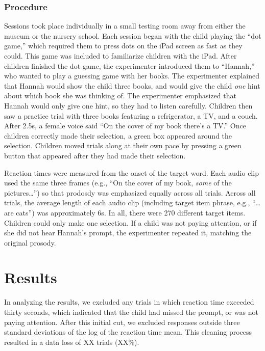 \documentclass[10pt, letterpaper]{article}
\begin{document}
\subsubsection{Procedure}\label{procedure}

Sessions took place individually in a small testing room away from
either the museum or the nursery school. Each session began with the
child playing the ``dot game,'' which required them to press dots on the
iPad screen as fast as they could. This game was included to familiarize
children with the iPad. After children finished the dot game, the
experimenter introduced them to ``Hannah,'' who wanted to play a
guessing game with her books. The experimenter explained that Hannah
would show the child three books, and would give the child \emph{one}
hint about which book she was thinking of. The experimenter emphasized
that Hannah would only give one hint, so they had to listen carefully.
Children then saw a practice trial with three books featuring a
refrigerator, a TV, and a couch. After 2.5s, a female voice said ``On
the cover of my book there's a TV.'' Once children correctly made their
selection, a green box appeared around the selection. Children moved
trials along at their own pace by pressing a green button that appeared
after they had made their selection.

Reaction times were measured from the onset of the target word. Each
audio clip used the same three frames (e.g., ``On the cover of my book,
\emph{some} of the pictures\ldots{}'') so that prodosdy was emphasized
equally across all trials. Across all trials, the average length of each
audio clip (including target item phrase, e.g., ``\ldots{}are cats'')
was approximately 6s. In all, there were 270 different target items.
Children could only make one selection. If a child was not paying
attention, or if she did not hear Hannah's prompt, the experimenter
repeated it, matching the original prosody.

\section{Results}\label{results}

In analyzing the results, we excluded any trials in which reaction time
exceeded thirty seconds, which indicated that the child had missed the
prompt, or was not paying attention. After this initial cut, we excluded
responses outside three standard deviations of the log of the reaction
time mean. This cleaning process resulted in a data loss of XX trials
(XX\%).
\end{document}
